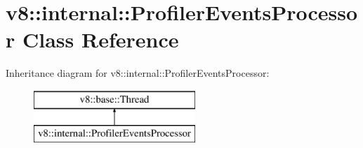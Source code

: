 \hypertarget{classv8_1_1internal_1_1_profiler_events_processor}{}\section{v8\+:\+:internal\+:\+:Profiler\+Events\+Processor Class Reference}
\label{classv8_1_1internal_1_1_profiler_events_processor}
Inheritance diagram for v8\+:\+:internal\+:\+:Profiler\+Events\+Processor\+:\begin{figure}[H]
\begin{center}
\leavevmode
\includegraphics[height=2.000000cm]{classv8_1_1internal_1_1_profiler_events_processor}
\end{center}
\end{figure}
